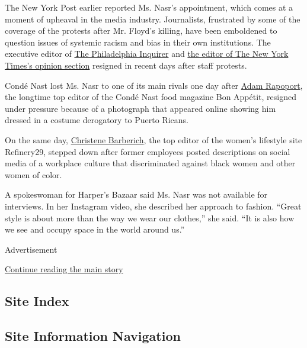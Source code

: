 The New York Post earlier reported Ms. Nasr's appointment, which comes
at a moment of upheaval in the media industry. Journalists, frustrated
by some of the coverage of the protests after Mr. Floyd's killing, have
been emboldened to question issues of systemic racism and bias in their
own institutions. The executive editor of
\href{https://www.nytimes3xbfgragh.onion/2020/06/06/business/media/editor-philadephia-inquirer-resigns.html}{The
Philadelphia Inquirer} and
\href{https://www.nytimes3xbfgragh.onion/2020/06/07/business/media/james-bennet-resigns-nytimes-op-ed.html}{the
editor of The New York Times's opinion section} resigned in recent days
after staff protests.

Condé Nast lost Ms. Nasr to one of its main rivals one day after
\href{https://www.nytimes3xbfgragh.onion/2020/06/08/dining/bon-appetit-adam-rapoport.html}{Adam
Rapoport}, the longtime top editor of the Condé Nast food magazine Bon
Appétit, resigned under pressure because of a photograph that appeared
online showing him dressed in a costume derogatory to Puerto Ricans.

On the same day,
\href{https://www.nytimes3xbfgragh.onion/2020/06/08/business/media/refinery-29-christene-barberich.html}{Christene
Barberich}, the top editor of the women's lifestyle site Refinery29,
stepped down after former employees posted descriptions on social media
of a workplace culture that discriminated against black women and other
women of color.

A spokeswoman for Harper's Bazaar said Ms. Nasr was not available for
interviews. In her Instagram video, she described her approach to
fashion. ``Great style is about more than the way we wear our clothes,''
she said. ``It is also how we see and occupy space in the world around
us.''

Advertisement

\protect\hyperlink{after-bottom}{Continue reading the main story}

\hypertarget{site-index}{%
\subsection{Site Index}\label{site-index}}

\hypertarget{site-information-navigation}{%
\subsection{Site Information
Navigation}\label{site-information-navigation}}

